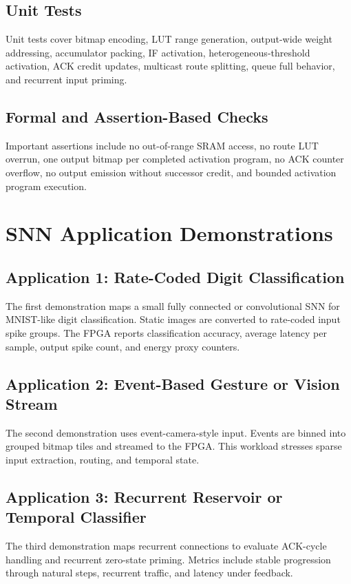 \documentclass[10pt,conference]{IEEEtran}
\begin{document}
\subsection{Unit Tests}
Unit tests cover bitmap encoding, LUT range generation, output-wide weight addressing, accumulator packing, IF activation, heterogeneous-threshold activation, ACK credit updates, multicast route splitting, queue full behavior, and recurrent input priming.

\subsection{Formal and Assertion-Based Checks}
Important assertions include no out-of-range SRAM access, no route LUT overrun, one output bitmap per completed activation program, no ACK counter overflow, no output emission without successor credit, and bounded activation program execution.

\section{SNN Application Demonstrations}
\subsection{Application 1: Rate-Coded Digit Classification}
The first demonstration maps a small fully connected or convolutional SNN for MNIST-like digit classification. Static images are converted to rate-coded input spike groups. The FPGA reports classification accuracy, average latency per sample, output spike count, and energy proxy counters.

\subsection{Application 2: Event-Based Gesture or Vision Stream}
The second demonstration uses event-camera-style input. Events are binned into grouped bitmap tiles and streamed to the FPGA. This workload stresses sparse input extraction, routing, and temporal state.

\subsection{Application 3: Recurrent Reservoir or Temporal Classifier}
The third demonstration maps recurrent connections to evaluate ACK-cycle handling and recurrent zero-state priming. Metrics include stable progression through natural steps, recurrent traffic, and latency under feedback.
\end{document}
